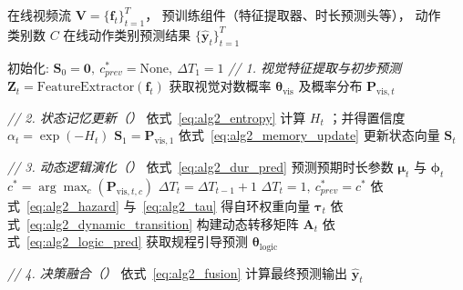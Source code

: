 \begin{algorithm}[!htbp]
    \renewcommand{\algorithmicrequire}{\textbf{输入：}}
    \renewcommand{\algorithmicensure}{\textbf{输出：}}
    
    \caption{\sexytwo 的在线推理流程}\label{alg:alg2_pipeline}
    \begin{algorithmic}[1] %
    \REQUIRE 
        在线视频流 \( \mathbf{V} = \{\mathbf{f}_t\}_{t=1}^T \)，
        预训练组件（特征提取器、时长预测头等），
        动作\\类别数 \( C \)
    \ENSURE 
        在线动作类别预测结果 \( \{\hat{\mathbf{y}}_t\}_{t=1}^T \)

    \STATE 初始化: \( \mathbf{S}_0 = \mathbf{0}, \ c^*_{prev} = \text{None}, \ \Delta T_1 = 1 \)
        \STATE \textit{// 1. 视觉特征提取与初步预测}
        \STATE \( \mathbf{Z}_t = \text{FeatureExtractor}(\mathbf{f}_t) \)
        \STATE 获取视觉对数概率 \( \mathbf{\theta}_{\mathrm{vis}} \) 及概率分布 \( \mathbf{P}_{\mathrm{vis}, t} \)
        
        \STATE \textit{// 2. 状态记忆更新（\memoryunit）}
        \STATE 依式~\ref{eq:alg2_entropy} 计算 \( H_t \) ；并得置信度 \( \alpha_t = \exp(-H_t) \)
            \STATE \( \mathbf{S}_1 = \mathbf{P}_{\mathrm{vis}, 1} \)
        \ELSE
            \STATE 依式~\ref{eq:alg2_memory_update} 更新状态向量 \( \mathbf{S}_t \)
        \ENDIF
        
        \STATE \textit{// 3. 动态逻辑演化（\evolution）}
        \STATE 依式~\ref{eq:alg2_dur_pred} 预测预期时长参数 \( \boldsymbol{\mu}_t \) 与 \( \boldsymbol{\phi}_t \)
        \STATE \( c^* = \arg\max_c(\mathbf{P}_{\mathrm{vis}, t, c}) \)
            \STATE \( \Delta T_t = \Delta T_{t-1} + 1 \)
        \ELSE
            \STATE \( \Delta T_t = 1, \ c^*_{prev} = c^* \)
        \ENDIF
        \STATE 依式~\ref{eq:alg2_hazard} 与~\ref{eq:alg2_tau} 得自环权重向量 \(\boldsymbol{\tau}_t\)
        \STATE 依式~\ref{eq:alg2_dynamic_transition} 构建动态转移矩阵 \( \mathbf{A}_t \)
        \STATE 依式~\ref{eq:alg2_logic_pred} 获取规程引导预测 \(\mathbf{\theta}_{\mathrm{logic}}\)
        
        \STATE \textit{// 4. 决策融合（\fusion）}
        \STATE 依式~\ref{eq:alg2_fusion} 计算最终预测输出 \( \hat{\mathbf{y}}_t \)
    \ENDFOR
    \end{algorithmic}
\end{algorithm}

